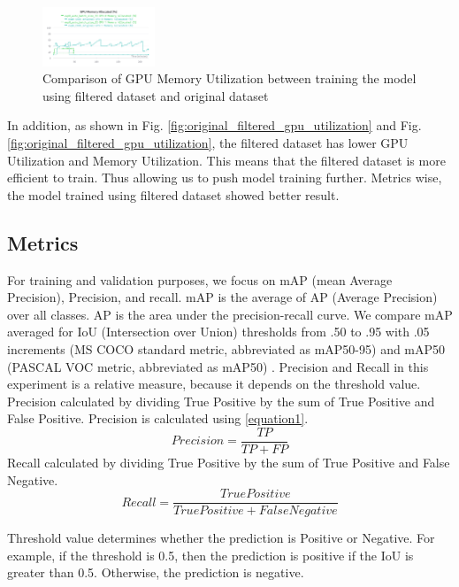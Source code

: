 \documentclass[conference]{IEEEtran}
\begin{document}
\begin{figure}[h]
\centering
\includegraphics[width=0.3\textwidth,keepaspectratio]{memory_utilization_comparison_original_and_filtered.png}
\caption{Comparison of GPU Memory Utilization between training the model using filtered dataset and original dataset}
\label{fig:original_filtered_memory_utilization}
\end{figure}
In addition, as shown in Fig. \ref{fig:original_filtered_gpu_utilization} and Fig.\ref{fig:original_filtered_gpu_utilization}, the filtered dataset has lower GPU Utilization and Memory Utilization. This means that the filtered dataset is more efficient to train.
Thus allowing us to push model training further.
Metrics wise, the model trained using filtered dataset showed better result.


\subsection{Metrics}
For training and validation purposes, we focus on mAP (mean Average Precision), Precision, and recall. mAP is the average of AP (Average Precision) over all classes. AP is the area under the precision-recall curve.
We compare mAP averaged for IoU (Intersection over Union) thresholds from .50 to .95 with .05 increments (MS COCO standard metric, abbreviated as mAP50-95) and mAP50 (PASCAL VOC metric, abbreviated as mAP50) \cite{b7}. 
Precision and Recall in  this experiment is a relative measure, because it depends on the threshold value.
Precision calculated by dividing True Positive by the sum of True Positive and False Positive. 
Precision is calculated using \eqref{equation1}.
\begin{equation}
Precision = \frac{TP}{TP+FP}
\label{equation1}
\end{equation}
Recall calculated by dividing True Positive by the sum of True Positive and False Negative.
\[Recall = \frac{True Positive}{TruePositive+FalseNegative}\]

Threshold value determines whether the prediction is Positive or Negative. For example, if the threshold is 0.5, then the prediction is positive if the IoU is greater than 0.5. Otherwise, the prediction is negative.
\end{document}
